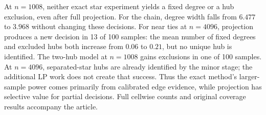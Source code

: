 At $n=1008$, neither exact star experiment yields a fixed degree or a hub exclusion, even after full projection. For the chain, degree width falls from $6.477$ to $3.968$ without changing these decisions. For near ties at $n=4096$, projection produces a new decision in 13 of 100 samples: the mean number of fixed degrees and excluded hubs both increase from $0.06$ to $0.21$, but no unique hub is identified. The two-hub model at $n=1008$ gains exclusions in one of 100 samples. At $n=4096$, separated-star hubs are already identified by the minor stage; the additional LP work does not create that success. Thus the exact method's larger-sample power comes primarily from calibrated edge evidence, while projection has selective value for partial decisions. Full cellwise counts and original coverage results accompany the article.
